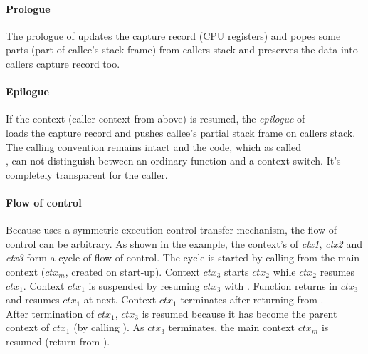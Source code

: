 \paragraph*{Prologue}
The prologue of \ectxop updates the capture record (CPU registers) and popes
some parts (part of callee's stack frame) from callers stack and preserves the
data into callers capture record too.

\paragraph*{Epilogue}
If the context (caller context from above) is resumed, the \emph{epilogue} of\\
\ectxop loads the capture record and pushes callee's partial stack frame on
callers stack. The calling convention remains intact and the code, which as
called\\
\ectxop, can not distinguish between an ordinary function and a context switch.
It's completely transparent for the caller.

\paragraph*{Flow of control}
Because \ectx uses a symmetric execution control transfer mechanism, the flow
of control can be arbitrary.
As shown in the example, the context's of \emph{ctx1}, \emph{ctx2} and
\emph{ctx3} form a cycle of flow of control.
The cycle is started by calling  from the main context
(\emph{$ctx_m$}, created on start-up). Context \emph{$ctx_3$} starts
\emph{$ctx_2$} while \emph{$ctx_2$} resumes \emph{$ctx_1$}. Context
\emph{$ctx_1$} is suspended by resuming \emph{$ctx_3$} with .
Function  returns in \emph{$ctx_3$} and  resumes
\emph{$ctx_1$} at next. Context \emph{$ctx_1$} terminates after returning from
.\\
After termination of \emph{$ctx_1$}, \emph{$ctx_3$} is resumed because it has
become the parent context of \emph{$ctx_1$} (by calling ). As
\emph{$ctx_3$} terminates, the main context \emph{$ctx_m$} is resumed (return
from ).

